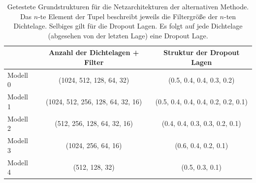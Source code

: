 %
%
\begin{table}
  \centering%
  \begin{tabular}{l
                  c
                  c}
      \toprule
      {}    & Anzahl der Dichtelagen + Filter     & Struktur der Dropout Lagen      \\
      \midrule
      Modell 0    & (1024, 512, 128, 64, 32)  & (0.5, 0.4, 0.4, 0.3, 0.2) \\
      Modell 1    & (1024, 512, 256, 128, 64, 32, 16)  & (0.5, 0.4, 0.4, 0.4, 0.2, 0.2, 0.1) \\
      Modell 2    & (512, 256, 128, 64, 32, 16)  & (0.4, 0.4, 0.3, 0.3, 0.2, 0.1) \\
      Modell 3    & (1024, 256, 64, 16)  & (0.6, 0.4, 0.2, 0.1) \\
      Modell 4    & (512, 128, 32)  & (0.5, 0.3, 0.1) \\
      \bottomrule
  \end{tabular}
  \caption{Getestete Grundstrukturen für die Netzarchitekturen der alternativen Methode. Das $n$-te Element der Tupel beschreibt jeweils die Filtergröße der $n$-ten Dichtelage. Selbiges gilt für die Dropout Lagen. Es folgt auf jede Dichtelage (abgesehen von der letzten Lage) eine Dropout Lage.}
  \label{tab:grid}
\end{table}
%
%
